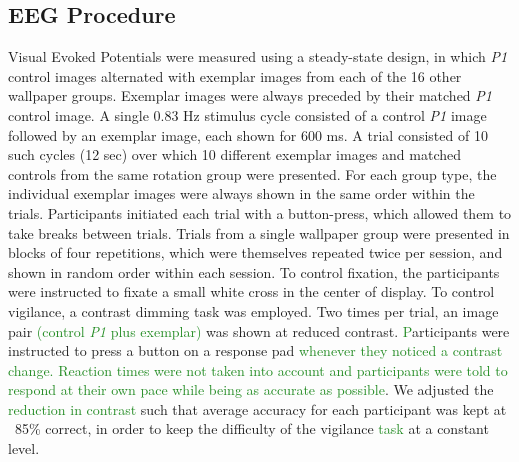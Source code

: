 \documentclass[11pt, twoside]{article}
\begin{document}
\subsection*{EEG Procedure}
Visual Evoked Potentials were measured using a steady-state design, in which \textit{P1} control images alternated with exemplar images from each of the 16 other wallpaper groups. Exemplar images were always preceded by their matched \textit{P1} control image. A single 0.83 Hz stimulus cycle consisted of a control \textit{P1} image followed by an exemplar image, each shown for 600 ms. A trial consisted of 10 such cycles (12 sec) over which 10 different exemplar images and matched controls from the same rotation group were presented. For each group type, the individual exemplar images were always shown in the same order within the trials. Participants initiated each trial with a button-press, which allowed them to take breaks between trials. Trials from a single wallpaper group were presented in blocks of four repetitions, which were themselves repeated twice per session, and shown in random order within each session. To control fixation, the participants were instructed to fixate a small white cross in the center of display. To control vigilance, a contrast dimming task was employed. Two times per trial, an image pair \textcolor{ForestGreen}{(control \textit{P1} plus exemplar)} was shown at reduced contrast. \textcolor{ForestGreen}{P}articipants were instructed to press a button on a response pad \textcolor{ForestGreen}{whenever they noticed a contrast change. Reaction times were not taken into account and participants were told to respond at their own pace while being as accurate as possible}. We adjusted the \textcolor{ForestGreen}{reduction in contrast} such that average accuracy for each participant was kept at ~85\% correct, in order to keep the difficulty of the vigilance \textcolor{ForestGreen}{task} at a constant level.
\end{document}
